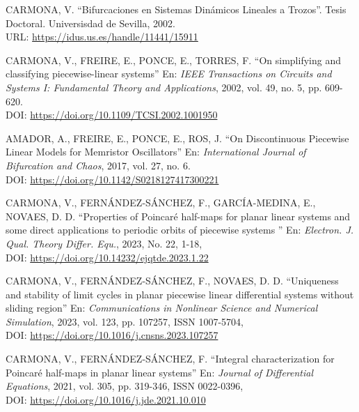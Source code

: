 \documentclass[12pt,a4paper]{report} %
\begin{document}
\begin{thebibliography}{99}
		 CARMONA, V. ``Bifurcaciones en Sistemas Dinámicos Lineales a Trozos''. Tesis Doctoral. Universisdad de Sevilla, 2002. \\URL: \href{https://idus.us.es/handle/11441/15911?locale-attribute=en}{https://idus.us.es/handle/11441/15911}
		
		 CARMONA, V., FREIRE, E., PONCE, E., TORRES, F. ``On simplifying and classifying piecewise-linear systems'' En: \textit{IEEE Transactions on Circuits and Systems I: Fundamental Theory and Applications}, 2002, vol. 49, no. 5, pp. 609-620. \\DOI: \href{https://doi.org/10.1109/TCSI.2002.1001950}{https://doi.org/10.1109/TCSI.2002.1001950}
		
		 AMADOR, A., FREIRE, E., PONCE, E., ROS, J. ``On Discontinuous Piecewise Linear Models for Memristor Oscillators'' En: \textit{International Journal of Bifurcation and Chaos}, 2017, vol. 27, no. 6. \\DOI: \href{https://doi.org/10.1142/S0218127417300221
		}{https://doi.org/10.1142/S0218127417300221}
		
		\newpage
		
		
		CARMONA, V., FERNÁNDEZ-SÁNCHEZ, F., GARCÍA-MEDINA, E., NOVAES, D. D. ``Properties of Poincaré half-maps for planar linear systems and some direct applications to periodic orbits of piecewise systems	'' En: \textit{Electron. J. Qual. Theory Differ. Equ.}, 2023, No. 22, 1-18, \\DOI: \href{https://doi.org/10.14232/ejqtde.2023.1.22}{https://doi.org/10.14232/ejqtde.2023.1.22}
		
		 CARMONA, V., FERNÁNDEZ-SÁNCHEZ, F., NOVAES, D. D. 
		``Uniqueness and stability of limit cycles in planar piecewise linear differential systems without sliding region'' En:
		\textit{Communications in Nonlinear Science and Numerical Simulation}, 2023, vol. 123, pp. 107257, ISSN 1007-5704,
		\\DOI: \href{https://doi.org/10.1016/j.cnsns.2023.107257}{https://doi.org/10.1016/j.cnsns.2023.107257}
		
		 CARMONA, V., FERNÁNDEZ-SÁNCHEZ, F.
		``Integral characterization for Poincaré half-maps in planar linear systems'' En: \textit{Journal of Differential Equations}, 2021, vol. 305, pp. 319-346, ISSN 0022-0396, \\DOI: \href{https://doi.org/10.1016/j.jde.2021.10.010}{https://doi.org/10.1016/j.jde.2021.10.010}
		

\end{thebibliography}
\end{document}
